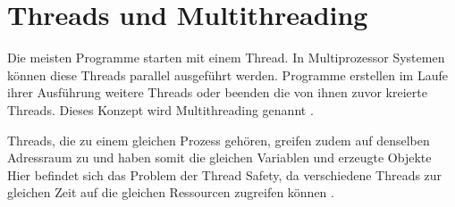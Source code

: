 \section{Threads und Multithreading}\label{sec:threads}

Die meisten Programme starten mit einem Thread. In Multiprozessor Systemen können diese Threads parallel ausgeführt werden. Programme erstellen im Laufe ihrer Ausführung weitere Threads oder beenden die von ihnen zuvor kreierte Threads. Dieses Konzept wird Multithreading genannt \cite[vgl.][70]{banerjee_theory_2006}.

Threads, die zu einem gleichen Prozess gehören, greifen zudem auf denselben Adressraum zu und haben somit die gleichen Variablen und erzeugte Objekte Hier befindet sich das Problem der Thread Safety, da verschiedene Threads zur gleichen Zeit auf die gleichen Ressourcen zugreifen können \cite[vgl.][2]{brian}.
